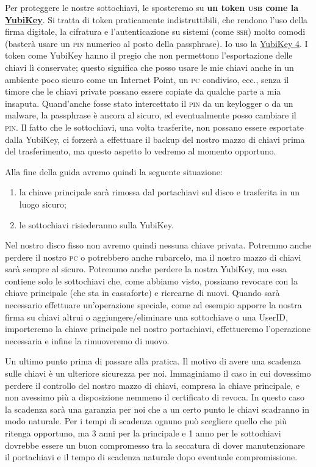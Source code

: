 \documentclass[a4paper,10pt]{article}
\begin{document}
Per proteggere le nostre sottochiavi, le sposteremo su \textbf{un token \textsc{usb} come la \href{https://www.yubico.com/}{YubiKey}}. Si tratta di token praticamente indistruttibili, che rendono l'uso della firma digitale, la cifratura e l'autenticazione su sistemi (come \textsc{ssh}) molto comodi (basterà usare un \textsc{pin} numerico al posto della passphrase). Io uso la \href{https://www.yubico.com/product/yubikey-4-series/#yubikey-4}{YubiKey 4}. I token come YubiKey hanno il pregio che non permettono l'esportazione delle chiavi lì conservate; questo significa che posso usare le mie chiavi anche in un ambiente poco sicuro come un Internet Point, un \textsc{pc} condiviso, ecc., senza il timore che le chiavi private possano essere copiate da qualche parte a mia insaputa. Quand'anche fosse stato intercettato il \textsc{pin} da un keylogger o da un malware, la passphrase è ancora al sicuro, ed eventualmente posso cambiare il \textsc{pin}. Il fatto che le sottochiavi, una volta trasferite, non possano essere esportate dalla YubiKey, ci forzerà a effettuare il backup del nostro mazzo di chiavi prima del trasferimento, ma questo aspetto lo vedremo al momento opportuno.

Alla fine della guida avremo quindi la seguente situazione:

\begin{enumerate}
 \item la chiave principale sarà rimossa dal portachiavi sul disco e trasferita in un luogo sicuro;
 \item le sottochiavi risiederanno sulla YubiKey.
\end{enumerate}

Nel nostro disco fisso non avremo quindi nessuna chiave privata. Potremmo anche perdere il nostro \textsc{pc} o potrebbero anche rubarcelo, ma il nostro mazzo di chiavi sarà sempre al sicuro. Potremmo anche perdere la nostra YubiKey, ma essa contiene solo le sottochiavi che, come abbiamo visto, possiamo revocare con la chiave principale (che sta in cassaforte) e ricrearne di nuovi. Quando sarà necessario effettuare un'operazione speciale, come ad esempio apporre la nostra firma su chiavi altrui o aggiungere/eliminare una sottochiave o una UserID, importeremo la chiave principale nel nostro portachiavi, effettueremo l'operazione necessaria e infine la rimuoveremo di nuovo.

Un ultimo punto prima di passare alla pratica. Il motivo di avere una scadenza sulle chiavi è un ulteriore sicurezza per noi. Immaginiamo il caso in cui dovessimo perdere il controllo del nostro mazzo di chiavi, compresa la chiave principale, e non avessimo più a disposizione nemmeno il certificato di revoca. In questo caso la scadenza sarà una garanzia per noi che a un certo punto le chiavi scadranno in modo naturale. Per i tempi di scadenza ognuno può scegliere quello che più ritenga opportuno, ma 3 anni per la principale e 1 anno per le sottochiavi dovrebbe essere un buon compromesso tra la seccatura di dover manutenzionare il portachiavi e il tempo di scadenza naturale dopo eventuale compromissione.
\end{document}
